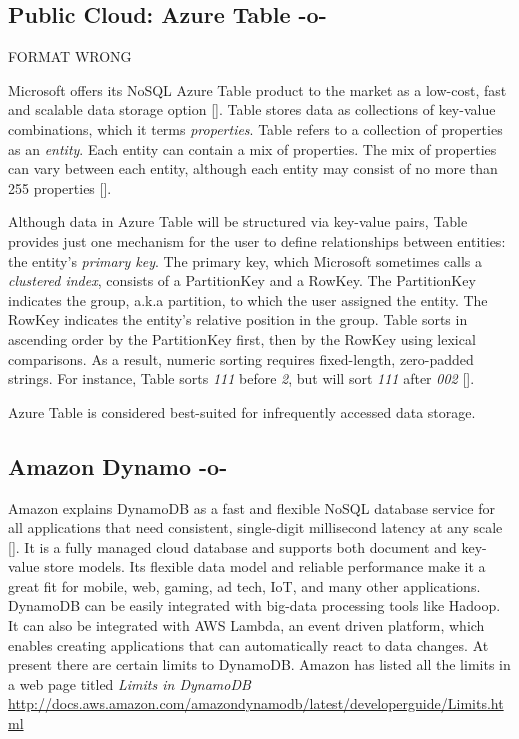      
\subsection{Public Cloud: Azure Table -o-}

     FORMAT WRONG

Microsoft offers its NoSQL Azure Table product to the market as a
low-cost, fast and scalable data storage option
[\cite{www-what-to-use}]. Table stores data as collections of
key-value combinations, which it terms \textit{properties}.  Table
refers to a collection of properties as an \textit{entity}.  Each
entity can contain a mix of properties.  The mix of properties can
vary between each entity, although each entity may consist of no more
than 255 properties [\cite{www-blobqueuetable}].

Although data in Azure Table will be structured via key-value pairs,
Table provides just one mechanism for the user to define relationships
between entities: the entity's \textit{primary key}.  The primary key,
which Microsoft sometimes calls a \textit{clustered index}, consists
of a PartitionKey and a RowKey.  The PartitionKey indicates the group,
a.k.a partition, to which the user assigned the entity.  The RowKey
indicates the entity's relative position in the group.  Table sorts in
ascending order by the PartitionKey first, then by the RowKey using
lexical comparisons.  As a result, numeric sorting requires
fixed-length, zero-padded strings.  For instance, Table sorts
\textit{111} before \textit{2}, but will sort \textit{111} after
\textit{002} [\cite{www-scalable-partitioning}].

Azure Table is considered best-suited for infrequently accessed data
storage.



\subsection{Amazon Dynamo -o-}

Amazon explains DynamoDB as a fast and flexible NoSQL database service
for all applications that need consistent, single-digit millisecond
latency at any scale [\cite{www.dyndb}].  It is a fully managed cloud
database and supports both document and key-value store models.  Its
flexible data model and reliable performance make it a great fit for
mobile, web, gaming, ad tech, IoT, and many other applications.
DynamoDB can be easily integrated with big-data processing tools like
Hadoop. It can also be integrated with AWS Lambda, an event driven
platform, which enables creating applications that can automatically
react to data changes. At present there are certain limits to
DynamoDB. Amazon has listed all the limits in a web page titled
\textit{Limits in DynamoDB }
\url{http://docs.aws.amazon.com/amazondynamodb/latest/developerguide/Limits.html}




